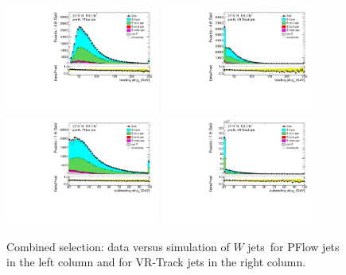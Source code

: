 \documentclass[letterpaper,12pt]{article}
\begin{document}
\begin{figure}[!h]
		\centering
		\includegraphics[width=0.45\textwidth]{FTAG_plots/pretagNoRwwithhighpTPFlowall/DataMC_h_J0_pt.pdf}
		\includegraphics[width=0.45\textwidth]{FTAG_plots/pretagNoRwwithhighpTVRJetsall/DataMC_h_J0_pttrackjet.pdf}\\
		\includegraphics[width=0.45\textwidth]{FTAG_plots/pretagNoRwwithhighpTPFlowall/DataMC_h_J1_pt.pdf}
		\includegraphics[width=0.45\textwidth]{FTAG_plots/pretagNoRwwithhighpTVRJetsall/DataMC_h_J1_pttrackjet.pdf}\\
		\caption{Combined selection: data versus simulation of $W$ jets\pt\ for 
		PFlow jets in the left column and for VR-Track jets in the right column.}
		\label{fig:kinematic_distributions_combined}
\end{figure}
		
\end{document}

